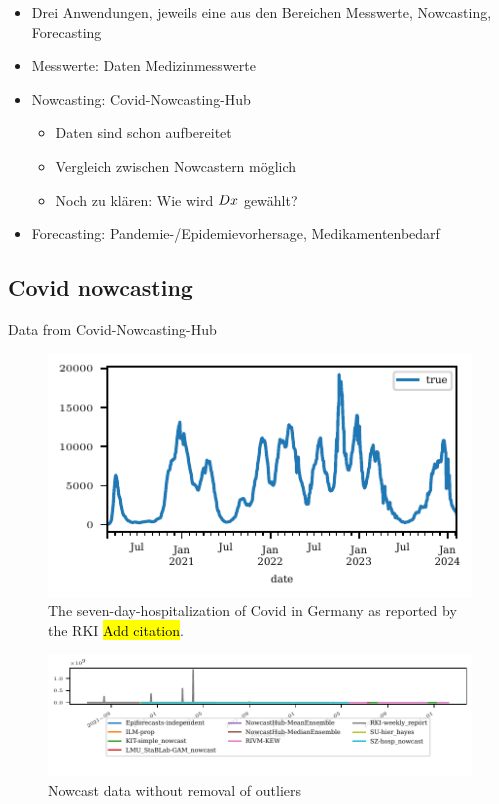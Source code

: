 \begin{itemize}
    \item Drei Anwendungen, jeweils eine aus den Bereichen Messwerte, Nowcasting, Forecasting
    \item Messwerte: Daten Medizinmesswerte
    \item Nowcasting: Covid-Nowcasting-Hub
    \begin{itemize}
        \item Daten sind schon aufbereitet
        \item Vergleich zwischen Nowcastern möglich
        \item Noch zu klären: Wie wird $Dx$ gewählt?
    \end{itemize}
    \item Forecasting: Pandemie-/Epidemievorhersage, Medikamentenbedarf
\end{itemize}

\subsection{Covid nowcasting}

Data from Covid-Nowcasting-Hub


\begin{figure}
    \centering
    \includegraphics{plots/covid_nowcast/00_true_data.pdf}
    \caption{The seven-day-hospitalization of Covid in Germany as reported by the RKI \hl{Add citation}.}
    \label{fig:app-covid-true}
\end{figure}

\begin{figure}
    \centering
    \includegraphics{plots/covid_nowcast/00_nowcast_data.pdf}
    \caption{Nowcast data without removal of outliers}
    \label{fig:app-covid-nowcast}
\end{figure}

